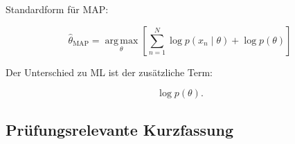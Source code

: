 \documentclass[11pt,a4paper]{scrartcl}
\begin{document}
\begin{answerbox}
    Standardform für MAP:

    \[
        \boxed{
            \hat\theta_{\mathrm{MAP}}
            =
            \operatorname*{arg\,max}_{\theta}
            \left[
                \sum_{n=1}^{N}
                \log p(x_n \mid \theta)
                +
                \log p(\theta)
            \right]
        }
    \]

    Der Unterschied zu ML ist der zusätzliche Term:

    \[
        \boxed{
            \log p(\theta).
        }
    \]
\end{answerbox}

\subsection{Prüfungsrelevante Kurzfassung}
\end{document}

